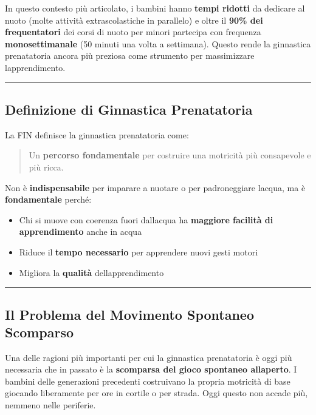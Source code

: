 \documentclass[a4paper,11pt]{article}
\providecommand{\tightlist}{%
  \setlength{\itemsep}{0pt}\setlength{\parskip}{0pt}}
\begin{document}
In questo contesto più articolato, i bambini hanno \textbf{tempi
      ridotti} da dedicare al nuoto (molte attività extrascolastiche in
parallelo) e oltre il \textbf{90\% dei frequentatori} dei corsi di nuoto
per minori partecipa con frequenza \textbf{monosettimanale} (50 minuti
una volta a settimana). Questo rende la ginnastica prenatatoria ancora
più preziosa come strumento per massimizzare
l\textquotesingle apprendimento.

\begin{center}\rule{0.5\linewidth}{0.5pt}\end{center}

\subsection{Definizione di Ginnastica
      Prenatatoria}\label{definizione-di-ginnastica-prenatatoria}

La FIN definisce la ginnastica prenatatoria come:

\begin{quote}
      Un \textbf{percorso fondamentale} per costruire una motricità più
      consapevole e più ricca.
\end{quote}

Non è \textbf{indispensabile} per imparare a nuotare o per padroneggiare
l\textquotesingle acqua, ma è \textbf{fondamentale} perché:

\begin{itemize}
      \tightlist
      \item
            Chi si muove con coerenza fuori dall\textquotesingle acqua ha
            \textbf{maggiore facilità di apprendimento} anche in acqua
      \item
            Riduce il \textbf{tempo necessario} per apprendere nuovi gesti motori
      \item
            Migliora la \textbf{qualità} dell\textquotesingle apprendimento
\end{itemize}

\begin{center}\rule{0.5\linewidth}{0.5pt}\end{center}

\subsection{Il Problema del Movimento Spontaneo
      Scomparso}\label{il-problema-del-movimento-spontaneo-scomparso}

Una delle ragioni più importanti per cui la ginnastica prenatatoria è
oggi più necessaria che in passato è la \textbf{scomparsa del gioco
      spontaneo all\textquotesingle aperto}. I bambini delle generazioni
precedenti costruivano la propria motricità di base giocando liberamente
per ore in cortile o per strada. Oggi questo non accade più, nemmeno
nelle periferie.
\end{document}
